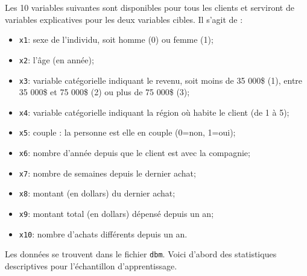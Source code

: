 \documentclass[
  11pt,
  letterpaper,
]{scrbook}
\newenvironment{Shaded}{\begin{snugshade}}{\end{snugshade}}
\newcommand{\AttributeTok}[1]{\textcolor[rgb]{0.40,0.45,0.13}{#1}}
\newcommand{\CommentTok}[1]{\textcolor[rgb]{0.37,0.37,0.37}{#1}}
\newcommand{\FunctionTok}[1]{\textcolor[rgb]{0.28,0.35,0.67}{#1}}
\newcommand{\NormalTok}[1]{\textcolor[rgb]{0.00,0.23,0.31}{#1}}
\newcommand{\StringTok}[1]{\textcolor[rgb]{0.13,0.47,0.30}{#1}}
\providecommand{\tightlist}{%
  \setlength{\itemsep}{0pt}\setlength{\parskip}{0pt}}\usepackage{longtable,booktabs,array}
\theoremstyle{definition}
\theoremstyle{remark}
\begin{document}
Les 10 variables suivantes sont disponibles pour tous les clients et
serviront de variables explicatives pour les deux variables cibles. Il
s'agit de :

\begin{itemize}
\tightlist
\item
  \texttt{x1}: sexe de l'individu, soit homme (0) ou femme (1);
\item
  \texttt{x2}: l'âge (en année);
\item
  \texttt{x3}: variable catégorielle indiquant le revenu, soit moins de
  35 000\$ (1), entre 35 000\$ et 75 000\$ (2) ou plus de 75 000\$ (3);
\item
  \texttt{x4}: variable catégorielle indiquant la région où habite le
  client (de 1 à 5);
\item
  \texttt{x5}: couple : la personne est elle en couple (0=non, 1=oui);
\item
  \texttt{x6}: nombre d'année depuis que le client est avec la
  compagnie;
\item
  \texttt{x7}: nombre de semaines depuis le dernier achat;
\item
  \texttt{x8}: montant (en dollars) du dernier achat;
\item
  \texttt{x9}: montant total (en dollars) dépensé depuis un an;
\item
  \texttt{x10}: nombre d'achats différents depuis un an.
\end{itemize}

Les données se trouvent dans le fichier \texttt{dbm}. Voici d'abord des
statistiques descriptives pour l'échantillon d'apprentissage.

\begin{Shaded}
\end{Shaded}
\end{document}
